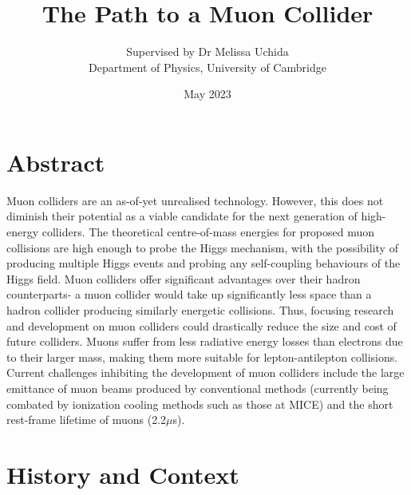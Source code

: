 \documentclass{article}
\title{The Path to a Muon Collider}
\author{Supervised by Dr Melissa Uchida \\ Department of Physics, University of Cambridge}
\date{May 2023}
\begin{document}
	
	\maketitle
	
	
	\tableofcontents
	
	\section{Abstract}
	
	\par Muon colliders are an as-of-yet unrealised technology. However, this does not diminish their potential as a viable candidate for the next generation of high-energy colliders. The theoretical centre-of-mass energies for proposed muon collisions are high enough to probe the Higgs mechanism, with the possibility of producing multiple Higgs events and probing any self-coupling behaviours of the Higgs field. Muon colliders offer significant advantages over their hadron counterparts- a muon collider would take up significantly less space than a hadron collider producing similarly energetic collisions. Thus, focusing research and development on muon colliders could drastically reduce the size and cost of future colliders. Muons suffer from less radiative energy losses than electrons due to their larger mass, making them more suitable for lepton-antilepton collisions. Current challenges inhibiting the development of muon colliders include the large emittance of muon beams produced by conventional methods (currently being combated by ionization cooling methods such as those at MICE) and the short rest-frame lifetime of muons (2.2$\mu$s).
	
	
	\section{History and Context}
	
\end{document}
